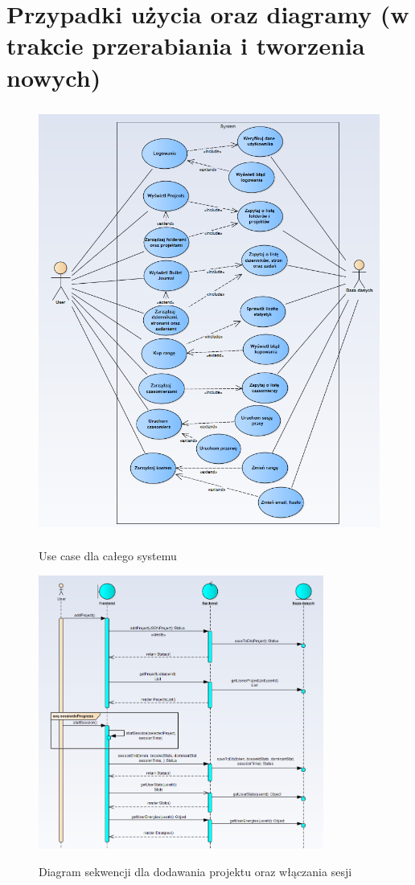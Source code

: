 \documentclass[a4paper,11pt]{report}
\begin{document}
\section{Przypadki użycia oraz diagramy (w trakcie przerabiania i tworzenia nowych)}
\begin{figure}[h]
	\centering
	\includegraphics[width=\textwidth, height=14cm]{systemusecase}\\
	\caption{Use case dla całego systemu}
	\label{fig:usecase}
\end{figure}
\begin{figure}[h]
	\centering
	\includegraphics[width=\textwidth, height=9cm]{sekwencji}\\
	\caption{Diagram sekwencji dla dodawania projektu oraz włączania sesji}
	\label{fig:seq1}
\end{figure}
\end{document}
